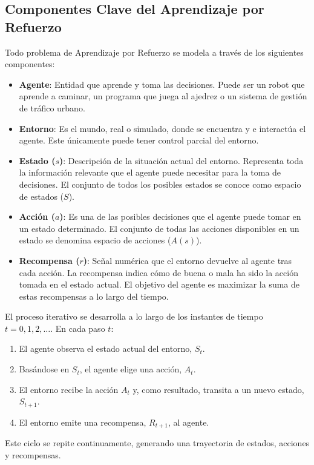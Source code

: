 \documentclass[12pt,a4paper]{book}
\begin{document}
\subsection{Componentes Clave del Aprendizaje por Refuerzo}

Todo problema de Aprendizaje por Refuerzo se modela a través de los siguientes componentes:

\begin{itemize}
    \item \textbf{Agente}: Entidad que aprende y toma las decisiones. Puede ser un robot que aprende a caminar, un programa que juega al ajedrez o un sistema de gestión de tráfico urbano.
    \item \textbf{Entorno}: Es el mundo, real o simulado, donde se encuentra y e interactúa el agente. Este únicamente puede tener control parcial del entorno.
    \item \textbf{Estado ($s$)}: Descripción de la situación actual del entorno. Representa toda la información relevante que el agente puede necesitar para la toma de decisiones. El conjunto de todos los posibles estados se conoce como espacio de estados ($S$).
    \item \textbf{Acción ($a$)}: Es una de las posibles decisiones que el agente puede tomar en un estado determinado. El conjunto de todas las acciones disponibles en un estado se denomina espacio de acciones ($A(s)$).
    \item \textbf{Recompensa ($r$)}: Señal numérica que el entorno devuelve al agente tras cada acción. La recompensa indica cómo de buena o mala ha sido la acción tomada en el estado actual. El objetivo del agente es maximizar la suma de estas recompensas a lo largo del tiempo.
\end{itemize}

El proceso iterativo se desarrolla a lo largo de los instantes de tiempo $t=0, 1, 2, \dots$. En cada paso $t$:
\begin{enumerate}
    \item El agente observa el estado actual del entorno, $S_t$.
    \item Basándose en $S_t$, el agente elige una acción, $A_t$.
    \item El entorno recibe la acción $A_t$ y, como resultado, transita a un nuevo estado, $S_{t+1}$.
    \item El entorno emite una recompensa, $R_{t+1}$, al agente.
\end{enumerate}
Este ciclo se repite continuamente, generando una trayectoria de estados, acciones y recompensas.
\end{document}
